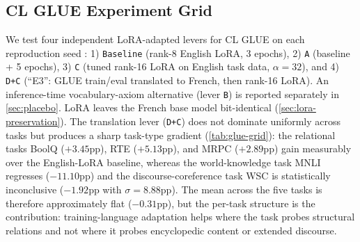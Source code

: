 \documentclass[11pt]{article}
\begin{document}
\subsection{CL GLUE Experiment Grid}
\label{sec:results-glue}

We test four independent LoRA-adapted levers for CL GLUE on each reproduction seed \citep{hu2021lora}: 1) \texttt{Baseline} (rank-8 English LoRA, 3 epochs), 2) \texttt{A} (baseline + 5 epochs), 3) \texttt{C} (tuned rank-16 LoRA on English task data, $\alpha\!=\!32$), and 4) \texttt{D+C} (\enquote{E3}: GLUE train/eval translated to French, then rank-16 LoRA). An inference-time vocabulary-axiom alternative (lever \texttt{B}) is reported separately in \autoref{sec:placebo}. LoRA leaves the French base model bit-identical (\autoref{sec:lora-preservation}).
The translation lever (\texttt{D+C}) does not dominate uniformly across tasks but produces a sharp task-type gradient (\autoref{tab:glue-grid}): the relational tasks BoolQ ($+3.45$pp), RTE ($+5.13$pp), and MRPC ($+2.89$pp) gain measurably over the English-LoRA baseline, whereas the world-knowledge task MNLI regresses ($-11.10$pp) and the discourse-coreference task WSC is statistically inconclusive ($-1.92$pp with $\sigma\!=\!8.88$pp). The mean across the five tasks is therefore approximately flat ($-0.31$pp), but the per-task structure is the contribution: training-language adaptation helps where the task probes structural relations and not where it probes encyclopedic content or extended discourse.

\begin{table}[t]
    \centering
    \caption{CL GLUE grid (mean $\pm$ std across 5 seeds); best per task in bold. $\Delta$ is the gain of \texttt{D+C} over the \texttt{Baseline}. MultiRC and QQP held at baseline values for budget reasons. Inference-time vocabulary axioms (lever \texttt{B}) are placebo-tested separately in \autoref{sec:placebo}.}
    \label{tab:glue-grid}
    \vspace{-1.25em}
\end{table}
\end{document}
